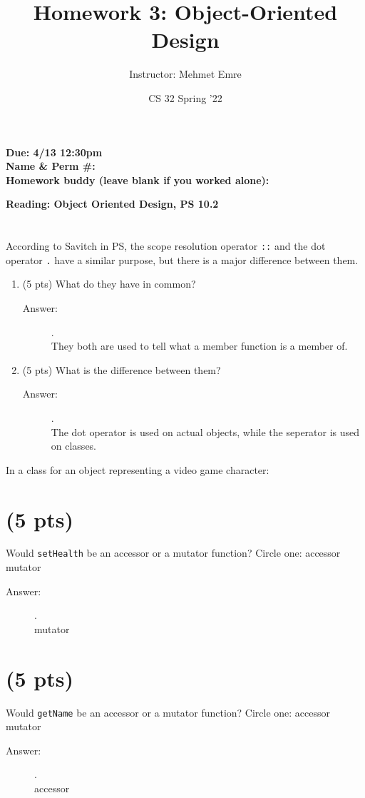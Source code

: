 \documentclass[11pt]{article}
\author{Instructor: Mehmet Emre}
\date{CS 32 Spring '22}
\title{Homework 3: Object-Oriented Design}
\begin{document}
\maketitle
\textbf{Due: 4/13 12:30pm} \\ 
\textbf{Name \& Perm \#:} \\ 
\textbf{Homework buddy (leave blank if you worked alone):}

\textbf{Reading: Object Oriented Design, PS 10.2}


\section{}
\label{sec:org311bec3}
According to Savitch in PS, the scope resolution operator \texttt{::} and
the dot operator \texttt{.} have a similar purpose, but there is a major
difference between them.
\begin{enumerate}
\item (5 pts) What do they have in common?
\begin{description}
    \item[Answer:] .\\
    They both are used to tell what a member function is a member of.
  \end{description}
\vspace{2em}
\item (5 pts) What is the difference between them?
\begin{description}
    \item[Answer:] .\\
    The dot operator is used on actual objects, while the seperator is used on classes.
  \end{description}
\vspace{6em}
\end{enumerate}


In a class for an object representing a video game character: 
\section{(5 pts)}
\label{sec:orge0fd38b}
Would \texttt{setHealth} be an accessor or a mutator function?
    Circle one: accessor \(\quad\) mutator
    \begin{description}
        \item[Answer:] .\\
        mutator
    \end{description}
\section{(5 pts)}
\label{sec:org413e13f}
Would \texttt{getName} be an accessor or a mutator function?
    Circle one: accessor \(\quad\) mutator
    \begin{description}
        \item[Answer:] .\\
        accessor
    \end{description}
\end{document}
